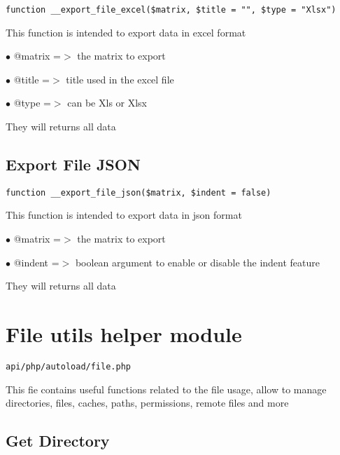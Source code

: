 \documentclass[a4paper]{book}
\begin{document}
\begin{lstlisting}
function __export_file_excel($matrix, $title = "", $type = "Xlsx")
\end{lstlisting}

This function is intended to export data in excel format

\begin{compactitem}
\item[\color{myblue}$\bullet$] @matrix =$>$ the matrix to export
\item[\color{myblue}$\bullet$] @title  =$>$ title used in the excel file
\item[\color{myblue}$\bullet$] @type   =$>$ can be Xls or Xlsx
\end{compactitem}

They will returns all data

\hypertarget{toc124}{}
\subsection{Export File JSON}

\begin{lstlisting}
function __export_file_json($matrix, $indent = false)
\end{lstlisting}

This function is intended to export data in json format

\begin{compactitem}
\item[\color{myblue}$\bullet$] @matrix =$>$ the matrix to export
\item[\color{myblue}$\bullet$] @indent =$>$ boolean argument to enable or disable the indent feature
\end{compactitem}

They will returns all data

\hypertarget{toc125}{}
\section{File utils helper module}

\begin{lstlisting}
api/php/autoload/file.php
\end{lstlisting}

This fie contains useful functions related to the file usage, allow to manage directories, files,
caches, paths, permissions, remote files and more

\hypertarget{toc126}{}
\subsection{Get Directory}
\end{document}
